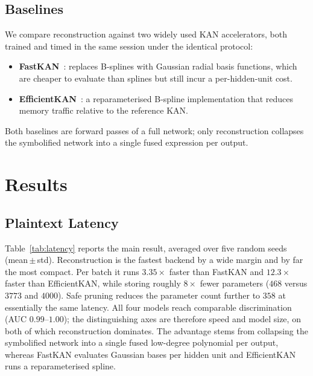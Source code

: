 \documentclass[conference]{IEEEtran}
\begin{document}
\subsection{Baselines}
We compare reconstruction against two widely used KAN accelerators, both
trained and timed in the same session under the identical protocol:
\begin{itemize}
\item \textbf{FastKAN}~\cite{fastkan}: replaces B-splines with Gaussian radial
basis functions, which are cheaper to evaluate than splines but still incur a
per-hidden-unit cost.
\item \textbf{EfficientKAN}~\cite{effkan}: a reparameterised B-spline
implementation that reduces memory traffic relative to the reference KAN.
\end{itemize}
Both baselines are forward passes of a full network; only reconstruction
collapses the symbolified network into a single fused expression per output.

\section{Results}

\subsection{Plaintext Latency}

Table~\ref{tab:latency} reports the main result, averaged over five random
seeds (mean\,$\pm$\,std). Reconstruction is the fastest backend by a wide
margin and by far the most compact. Per batch it runs $3.35\times$ faster than
FastKAN and $12.3\times$ faster than EfficientKAN, while storing roughly
$8\times$ fewer parameters ($468$ versus $3773$ and $4000$). Safe pruning
reduces the parameter count further to $358$ at essentially the same latency.
All four models reach comparable discrimination (AUC $0.99$--$1.00$); the
distinguishing axes are therefore speed and model size, on both of which
reconstruction dominates. The advantage stems from collapsing the symbolified
network into a single fused low-degree polynomial per output, whereas FastKAN
evaluates Gaussian bases per hidden unit and EfficientKAN runs a
reparameterised spline.
\end{document}
